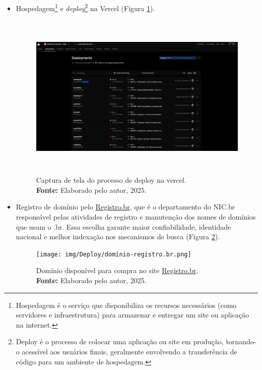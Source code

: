 \begin{itemize}
    \item Hospedagem\footnote{Hospedagem é o serviço que disponibiliza os recursos necessários (como servidores e infraestrutura) para armazenar e entregar um site ou aplicação na internet.} e \textit{deploy}\footnote{Deploy é o processo de colocar uma aplicação ou site em produção, tornando-o acessível aos usuários finais, geralmente envolvendo a transferência de código para um ambiente de hospedagem.} na Vercel (Figura \ref{fig:deploy_vercel}). 
\begin{figure}[H]
    \centering
    \includegraphics[height=8cm, keepaspectratio]{img/Deploy/deploy_vercel.png}
    \caption{ Captura de tela do processo de deploy na vercel. \\
        \textbf{Fonte:} Elaborado pelo autor, 2025.}
    \label{fig:deploy_vercel}
\end{figure}

    \item Registro de domínio pelo \href{www.registro.br}{Registro.br}, que é o departamento do NIC.br responsável pelas atividades de registro e manutenção dos nomes de domínios que usam o .br. Essa escolha garante maior confiabilidade, identidade nacional e melhor indexação nos mecanismos de busca (Figura \ref{fig:dominio_registro_br}).
\begin{figure}[H]
    \centering
    \texttt{[image: img/Deploy/domínio-registro.br.png]}
    \caption{ Domínio disponível para compra no site \href{www.registro.br}{Registro.br}. \\
        \textbf{Fonte:} Elaborado pelo autor, 2025.}
    \label{fig:dominio_registro_br}
\end{figure}


\end{itemize}
